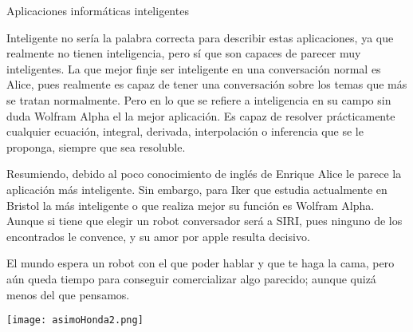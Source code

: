 \documentclass[spanish, a4paper, 12pt]{article} 	%
\begin{document}
	\newpage
\begin{section}{Aplicaciones informáticas inteligentes}

	Inteligente no sería la palabra correcta para describir estas aplicaciones, ya que realmente no tienen inteligencia, pero sí que son capaces de parecer muy inteligentes. La que mejor finje ser inteligente en una conversación normal es Alice, pues realmente es capaz de tener una conversación sobre los temas que más se tratan normalmente. Pero en lo que se refiere a inteligencia en su campo sin duda Wolfram Alpha el la mejor aplicación. Es capaz de resolver prácticamente cualquier ecuación, integral, derivada, interpolación o inferencia que se le proponga, siempre que sea resoluble. 
	
	Resumiendo, debido al poco conocimiento de inglés de Enrique Alice le parece la aplicación más inteligente. Sin embargo, para Iker que estudia actualmente en Bristol la más inteligente o que realiza mejor su función es Wolfram Alpha. Aunque si tiene que elegir un robot conversador será a SIRI, pues ninguno de los encontrados le convence, y su amor por apple resulta decisivo.
	
	El mundo espera un robot con el que poder hablar y que te haga la cama, pero aún queda  tiempo para conseguir comercializar algo parecido; aunque quizá menos del que pensamos.
		\begin{center}
		\texttt{[image: asimoHonda2.png]}
		\end{center}
	
\end{section}
\end{document}
